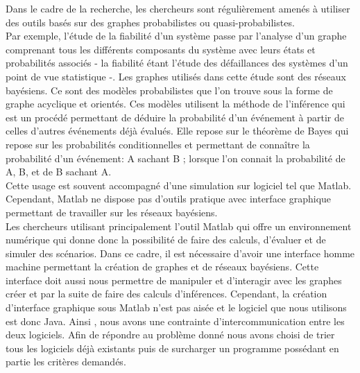 \documentclass[conference]{IEEEtran}
\begin{document}
Dans le cadre de la recherche, les chercheurs sont régulièrement amenés à utiliser des outils basés sur des graphes probabilistes ou quasi-probabilistes.\\
Par exemple, l'étude de la fiabilité d'un système passe par l'analyse d'un graphe comprenant tous les différents composants du système avec leurs états et probabilités associés - la fiabilité étant l'étude des défaillances des systèmes d'un point de vue statistique -. Les graphes utilisés dans cette étude sont des réseaux bayésiens. Ce sont des modèles probabilistes que l'on trouve sous la forme de graphe acyclique et orientés. Ces modèles utilisent la méthode de l'inférence qui est un procédé permettant de déduire la probabilité d'un événement à partir de celles d'autres événements déjà évalués. Elle repose sur le théorème de Bayes qui repose sur les probabilités conditionnelles et permettant de connaître la probabilité d'un événement:  A sachant B ; lorsque l'on connait la probabilité de A, B, et de B sachant A. \\
Cette usage est souvent accompagné d'une simulation sur logiciel tel que Matlab. Cependant, Matlab ne dispose pas d'outils pratique avec interface graphique permettant de travailler sur les réseaux bayésiens. \cite{Smail} \cite{kmurphy} \\

\tableofcontents
\vspace{0.8cm}
Les chercheurs utilisant principalement l'outil Matlab qui offre un environnement numérique qui donne donc la possibilité de faire des calculs, d'évaluer et de simuler des scénarios. Dans ce cadre, il est nécessaire d'avoir une interface homme machine permettant la création de graphes et de réseaux bayésiens. Cette interface doit aussi nous permettre de manipuler et d'interagir avec les graphes créer et par la suite de faire des calculs d'inférences. Cependant, la création d'interface graphique sous Matlab n'est pas aisée et le logiciel que nous utilisons est donc Java. Ainsi , nous avons une contrainte d'intercommunication entre les deux logiciels. 
Afin de répondre au problème donné nous avons choisi de trier tous les logiciels déjà existants puis de surcharger un programme possédant en partie les critères demandés. \\
\end{document}
